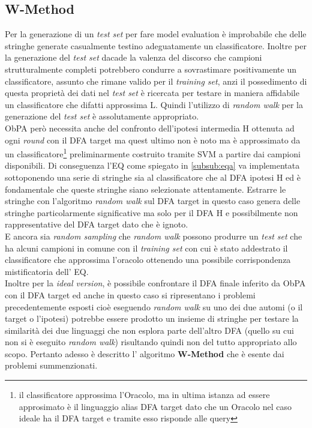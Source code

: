 \subsection{W-Method}
\label{sub:wme}
Per la generazione di un \textit{test set} per fare model evaluation  è improbabile che delle stringhe generate casualmente testino adeguatamente un classificatore. Inoltre per la generazione del \textit{test set} dacade la valenza del discorso che campioni strutturalmente completi potrebbero condurre a sovrastimare positivamente un classificatore, assunto che rimane valido per il \textit{training set}, anzi il possedimento di questa proprietà dei dati nel \textit{test set} è ricercata per testare in maniera affidabile un classificatore che difatti approssima \ac{L}. Quindi l'utilizzo di \textit{random walk} per la generazione del \textit{test set} è assolutamente appropriato. \\   \ac{ObPA} però necessita anche del confronto dell'ipotesi intermedia \ac{H} ottenuta ad ogni \textit{round} con il \ac{DFA} target ma quest ultimo non è noto ma è approssimato da un classificatore\footnote{il classificatore approssima l'Oracolo, ma in ultima istanza ad essere approsimato è il linguaggio alias \ac{DFA} target dato che un Oracolo nel caso ideale ha il \ac{DFA} target e tramite esso risponde alle query} preliminarmente costruito tramite \ac{SVM} a partire dai campioni disponibili.   Di conseguenza l'\ac{EQ} come spiegato in \ref{subsub:eqa} va implementata sottoponendo  una serie di stringhe sia al classificatore che al \ac{DFA} ipotesi \ac{H} ed è fondamentale che queste stringhe siano selezionate attentamente. Estrarre le stringhe con l'algoritmo \textit{random walk} sul \ac{DFA} target in questo caso genera delle stringhe particolarmente significative ma solo per il \ac{DFA} \ac{H} e possibilmente non rappresentative del \ac{DFA} target dato che è ignoto.\\
 E ancora sia  \textit{random sampling} che \textit{random walk} possono produrre un \textit{test set} che ha alcuni campioni in comune con il \textit{training set} con cui è stato addestrato il classificatore che approssima l'oracolo ottenendo una possibile corrispondenza mistificatoria dell' \ac{EQ}.\\
 Inoltre  per la \textit{ideal version}, è possibile confrontare il \ac{DFA} finale inferito da \ac{ObPA} con il \ac{DFA} target ed anche in questo caso si ripresentano i problemi precedentemente esposti cioè eseguendo \textit{random walk} su uno dei due automi (o il target o l'ipotesi) potrebbe essere prodotto un insieme di stringhe per testare la similarità dei due linguaggi che non esplora parte dell'altro \ac{DFA} (quello su cui non si è eseguito \textit{random walk}) risultando quindi non del tutto appropriato allo scopo. Pertanto adesso è descritto l' algoritmo \textbf{W-Method} \cite{Chow78} che è esente dai problemi summenzionati.

